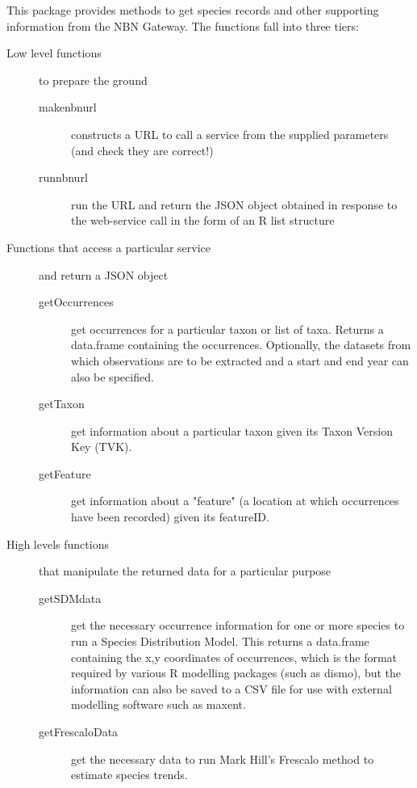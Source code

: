 \documentclass{article}
\begin{document}
This package provides methods to get species records and other supporting
information from the NBN Gateway. The functions fall into three tiers:
\begin{description}
  \item[Low level functions] to prepare the ground
  \begin{description}
    \item [makenbnurl] constructs a URL to call a service from the supplied
    parameters (and check they are correct!)
    \item [runnbnurl] run the URL and return the JSON object obtained in response
    to the web-service call in the form of an R list structure
  \end{description}
  \item[Functions that access a particular service] and return a JSON object
  \begin{description}
      \item[getOccurrences] get occurrences for a particular taxon or list of
      taxa. Returns a data.frame containing the occurrences. Optionally, the
      datasets from which observations are to be extracted and a start and end
      year can also be specified.
      \item[getTaxon] get information about a particular taxon given its Taxon
      Version Key (TVK).
      \item[getFeature] get information about a "feature" (a location at which
      occurrences have been recorded) given its featureID.
  \end{description}
  \item[High levels functions] that manipulate the returned data for
  a particular purpose
  \begin{description}
      \item[getSDMdata] get the necessary occurrence information for one or
      more species to run a Species Distribution Model. This returns a 
      data.frame containing the x,y coordinates of occurrences, which 
      is the format required by various R modelling packages (such as dismo),
      but the information can also be saved to a CSV file for use with external
      modelling software such as maxent.
      \item[getFrescaloData] get the necessary data to run Mark Hill's Frescalo
      method to estimate species trends.
  \end{description}
\end{description}
\end{document}
